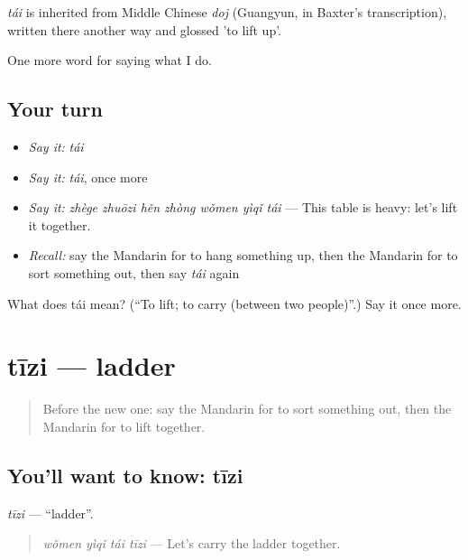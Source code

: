 \begin{cousinweb}
\emph{tái} is inherited from Middle Chinese \emph{doj} (Guangyun, in Baxter's transcription), written there another way and glossed 'to lift up'.
\end{cousinweb}

\begin{grammarlens}[title={What you've built}]
One more word for saying what I do.
\end{grammarlens}

\subsection*{Your turn}
\begin{itemize}
\raggedright
  \item \emph{Say it:} \emph{tái}
  \item \emph{Say it:} \emph{tái}, once more
  \item \emph{Say it:} \emph{zhège zhuōzi hěn zhòng wǒmen yìqǐ tái} — This table is heavy: let's lift it together.
  \item \emph{Recall:} say the Mandarin for to hang something up, then the Mandarin for to sort something out, then say \emph{tái} again
\end{itemize}

\begin{tcolorbox}[breakable,colback=teal!4,colframe=teal!35!black,title={Before you move on}]
What does tái mean? (\textquotedblleft{}To lift; to carry (between two people)\textquotedblright{}.) Say it once more.
\end{tcolorbox}
\section[tīzi]{tīzi — ladder}

\label{lesson:ZH-C174-tizi}



\begin{quote}
Before the new one: say the Mandarin for to sort something out, then the Mandarin for to lift together.
\end{quote}

\subsection*{You'll want to know: tīzi}
\emph{tīzi} — \textquotedblleft{}ladder\textquotedblright{}.

\begin{quote}
\emph{wǒmen yìqǐ tái tīzi} — Let's carry the ladder together.
\end{quote}

